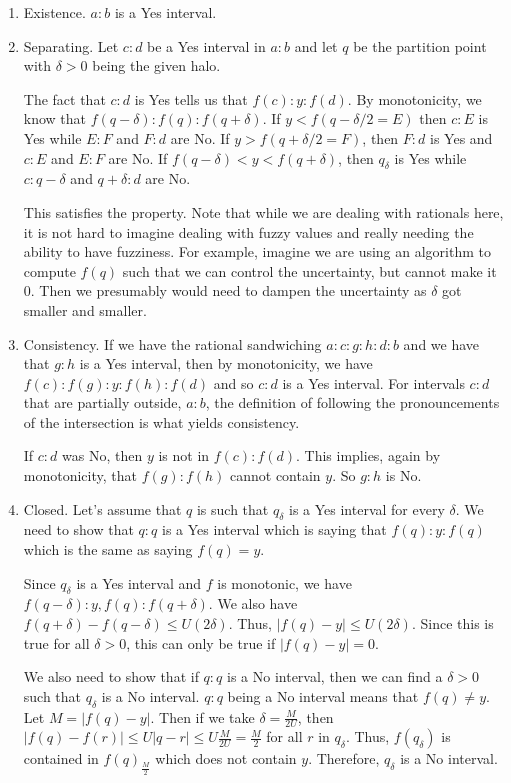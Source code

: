 \documentclass[12pt]{article}
\begin{document}
\begin{enumerate}
    \item Existence. $a:b$ is a Yes interval.

    \item Separating. Let $c:d$ be a Yes interval in $a:b$ and let $q$ be the partition point with $\delta>0$ being the given halo. 
    
    The fact that $c:d$ is Yes tells us that $f(c):y:f(d)$. By monotonicity, we know that $f(q - \delta):f(q):f(q+\delta)$. If $y < f(q-\delta/2 = E)$ then $c:E$ is Yes while $E:F$ and $F:d$ are No. If $y > f(q + \delta/2 = F)$, then $F:d$ is Yes and $c:E$ and $E:F$ are No. If $f(q-\delta) < y < f(q+\delta)$, then $q_\delta$ is Yes while $c:q-\delta$ and $q+\delta : d$ are No. 

    This satisfies the property. Note that while we are dealing with rationals here, it is not hard to imagine dealing with fuzzy values and really needing the ability to have fuzziness. For example, imagine we are using an algorithm to compute $f(q)$ such that we can control the uncertainty, but cannot make it 0. Then we presumably would need to dampen the uncertainty as $\delta$ got smaller and smaller. 
        
    \item Consistency. If we have the rational sandwiching $a:c:g:h:d:b$ and we have that $g:h$ is a Yes interval, then by monotonicity, we have $f(c):f(g):y:f(h):f(d)$ and so $c:d$ is a Yes interval. For intervals $c:d$ that are partially outside, $a:b$, the definition of following the pronouncements of the intersection is what yields consistency.

    If $c:d$ was No, then $y$ is not in $f(c):f(d)$. This implies, again by monotonicity, that $f(g):f(h)$ cannot contain $y$. So $g:h$ is No. 
     
    \item Closed. Let's assume that $q$ is such that $q_\delta$ is a Yes interval for every $\delta$. We need to show that $q:q$ is a Yes interval which is saying that $f(q):y:f(q)$ which is the same as saying $f(q) = y$. 

    Since $q_\delta$ is a Yes interval and $f$ is monotonic, we have $f(q-\delta):y, f(q):f(q+\delta)$. We also have $f(q +\delta) - f(q-\delta) \leq U (2 \delta)$. Thus, $|f(q) - y| \leq U (2 \delta)$. Since this is true for all $\delta > 0$, this can only be true if $|f(q) -y| = 0$. 
    
    We also need to show that if $q:q$ is a No interval, then we can find a $\delta > 0$ such that $q_\delta$ is a No interval. $q:q$ being a No interval means that $f(q) \neq y$. Let $M = |f(q)-y|$. Then if we take $\delta = \frac{M}{2U}$, then $|f(q) - f(r)| \leq U |q-r| \leq U \frac{M}{2U} = \frac{M}{2}$ for all $r$ in $q_\delta$. Thus, $f(q_\delta)$ is contained in $f(q)_\frac{M}{2}$ which does not contain $y$. Therefore, $q_\delta$ is a No interval. 
\end{enumerate}
\end{document}
